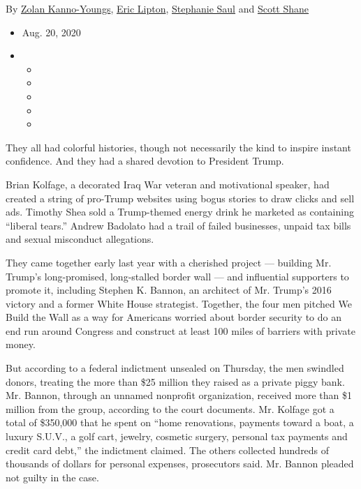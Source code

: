 By \href{https://www.nytimes3xbfgragh.onion/by/zolan-kanno-youngs}{Zolan
Kanno-Youngs},
\href{https://www.nytimes3xbfgragh.onion/by/eric-lipton}{Eric Lipton},
\href{https://www.nytimes3xbfgragh.onion/by/stephanie-saul}{Stephanie
Saul} and \href{https://www.nytimes3xbfgragh.onion/by/scott-shane}{Scott
Shane}

\begin{itemize}
\item
  Aug. 20, 2020
\item
  \begin{itemize}
  \item
  \item
  \item
  \item
  \item
  \end{itemize}
\end{itemize}

They all had colorful histories, though not necessarily the kind to
inspire instant confidence. And they had a shared devotion to President
Trump.

Brian Kolfage, a decorated Iraq War veteran and motivational speaker,
had created a string of pro-Trump websites using bogus stories to draw
clicks and sell ads. Timothy Shea sold a Trump-themed energy drink he
marketed as containing ``liberal tears.'' Andrew Badolato had a trail of
failed businesses, unpaid tax bills and sexual misconduct allegations.

They came together early last year with a cherished project --- building
Mr. Trump's long-promised, long-stalled border wall --- and influential
supporters to promote it, including Stephen K. Bannon, an architect of
Mr. Trump's 2016 victory and a former White House strategist. Together,
the four men pitched We Build the Wall as a way for Americans worried
about border security to do an end run around Congress and construct at
least 100 miles of barriers with private money.

But according to a federal indictment unsealed on Thursday, the men
swindled donors, treating the more than \$25 million they raised as a
private piggy bank. Mr. Bannon, through an unnamed nonprofit
organization, received more than \$1 million from the group, according
to the court documents. Mr. Kolfage got a total of \$350,000 that he
spent on ``home renovations, payments toward a boat, a luxury S.U.V., a
golf cart, jewelry, cosmetic surgery, personal tax payments and credit
card debt,'' the indictment claimed. The others collected hundreds of
thousands of dollars for personal expenses, prosecutors said. Mr. Bannon
pleaded not guilty in the case.


